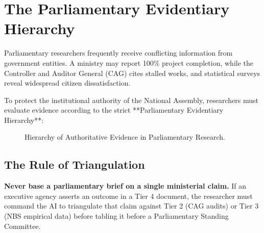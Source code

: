 \documentclass[11pt, a4paper]{report}
\begin{document}
\section{The Parliamentary Evidentiary Hierarchy}
Parliamentary researchers frequently receive conflicting information from government entities. A ministry may report 100\% project completion, while the Controller and Auditor General (CAG) cites stalled works, and statistical surveys reveal widespread citizen dissatisfaction.

To protect the institutional authority of the National Assembly, researchers must evaluate evidence according to the strict **Parliamentary Evidentiary Hierarchy**:

\begin{figure}[htbp]
  \centering
  \caption{Hierarchy of Authoritative Evidence in Parliamentary Research.}
  \label{fig:evidence_hierarchy}
\end{figure}

\subsection{The Rule of Triangulation}
\textbf{Never base a parliamentary brief on a single ministerial claim.} If an executive agency asserts an outcome in a Tier 4 document, the researcher must command the AI to triangulate that claim against Tier 2 (CAG audits) or Tier 3 (NBS empirical data) before tabling it before a Parliamentary Standing Committee.
\end{document}
